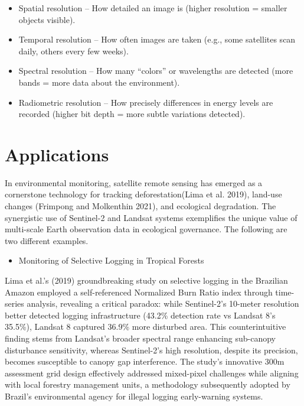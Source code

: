 \documentclass[
  letterpaper,
]{scrbook}
\providecommand{\tightlist}{%
  \setlength{\itemsep}{0pt}\setlength{\parskip}{0pt}}\usepackage{longtable,booktabs,array}
\begin{document}
\begin{itemize}
\item
  Spatial resolution -- How detailed an image is (higher resolution =
  smaller objects visible).
\item
  Temporal resolution -- How often images are taken (e.g., some
  satellites scan daily, others every few weeks).
\item
  Spectral resolution -- How many ``colors'' or wavelengths are detected
  (more bands = more data about the environment).
\item
  Radiometric resolution -- How precisely differences in energy levels
  are recorded (higher bit depth = more subtle variations detected).
\end{itemize}

\section{Applications}\label{applications}

In environmental monitoring, satellite remote sensing has emerged as a
cornerstone technology for tracking deforestation(Lima et al. 2019),
land-use changes (Frimpong and Molkenthin 2021), and ecological
degradation. The synergistic use of Sentinel-2 and Landsat systems
exemplifies the unique value of multi-scale Earth observation data in
ecological governance. The following are two different examples.

\begin{itemize}
\tightlist
\item
  Monitoring of Selective Logging in Tropical Forests
\end{itemize}

Lima et al.'s (2019) groundbreaking study on selective logging in the
Brazilian Amazon employed a self-referenced Normalized Burn Ratio index
through time-series analysis, revealing a critical paradox: while
Sentinel-2's 10-meter resolution better detected logging infrastructure
(43.2\% detection rate vs Landsat 8's 35.5\%), Landsat 8 captured 36.9\%
more disturbed area. This counterintuitive finding stems from Landsat's
broader spectral range enhancing sub-canopy disturbance sensitivity,
whereas Sentinel-2's high resolution, despite its precision, becomes
susceptible to canopy gap interference. The study's innovative 300m
assessment grid design effectively addressed mixed-pixel challenges
while aligning with local forestry management units, a methodology
subsequently adopted by Brazil's environmental agency for illegal
logging early-warning systems.
\end{document}

